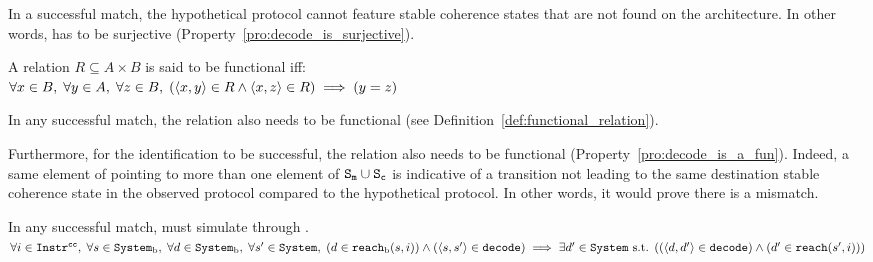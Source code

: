 In a successful match, the hypothetical protocol cannot feature stable coherence
states that are not found on the architecture. In other words, \decodefun{}
has to be surjective (Property~\ref{pro:decode_is_surjective}).

\begin{definition}
\label{def:functional_relation}
A relation $R \subseteq A \times B$ is said to be functional iff:\\
$
   \forallin{x}{B}{
      \forallin{y}{A}{
         \forallin{z}{B}{
            (\langle x, y \rangle \in R
            \land
            \langle x, z \rangle \in R
            )
            \implies (y = z)
         }%
      }%
   }%
$
\end{definition}

\begin{property}
\label{pro:decode_is_a_fun}
In any successful match, the \decodefun{} relation also needs to be functional
(see Definition~\ref{def:functional_relation}).
\end{property}

Furthermore, for the identification to be successful, the \decodefun{} relation
also needs to be functional (Property~\ref{pro:decode_is_a_fun}).
Indeed, a same element of \validarchboolflags{} pointing to more than one
element of $\text{\texttt{S\textsubscript{m}}}{} \cup \text{\texttt{S\textsubscript{c}}}{}$ is indicative of a
transition not leading to the same destination stable coherence state in the
observed protocol compared to the hypothetical protocol. In other words, it
would prove there is a mismatch.

\begin{property}
\label{pro:reachability_simulation_a}
   In any successful match,
   \hypreachfun{} must simulate \obsreachfun{} through \decodefun{}.\\
   $
      \forallin{i}{\systemaction{}}{%
         \forallin{s}{\obssystemstate{}}{%
            \forallin{d}{\obssystemstate{}}{%
               \forallin{s'}{\systemstate{}}{%
                  (d \in \obsreachfun{}(s, i))
                  \land (\langle{} s, s' \rangle{} \in \decodefun{})
                  \implies
                  \existsin{d'}{\systemstate{}}{%
                     (\langle{} d, d' \rangle{} \in \decodefun{})
                     \land (d' \in \hypreachfun{}(s', i))
                  }
               }
            }
         }
      }
   $
\end{property}

